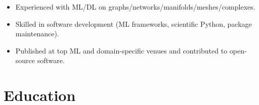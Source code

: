 \documentclass[11pt,a4paper,sans]{moderncv}
\begin{document}
\begin{itemize}  %
    \item Experienced with ML/DL on graphs/networks/manifolds/meshes/complexes.
    \item Skilled in software development (ML frameworks, scientific Python, package maintenance).
    \item Published at top ML and domain-specific venues and contributed to open-source software.
\end{itemize}


\section{Education}
\end{document}
